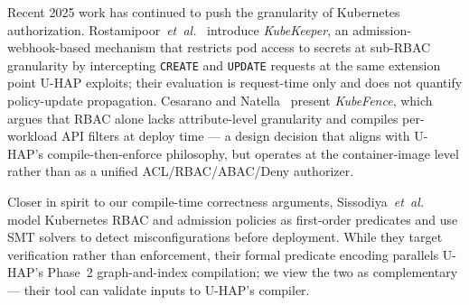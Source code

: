 

Recent 2025 work has continued to push the granularity of Kubernetes
authorization. Rostamipoor~\textit{et~al.}~\cite{rostamipoor2025kubekeeper}
introduce \emph{KubeKeeper}, an admission-webhook-based mechanism that
restricts pod access to secrets at sub-RBAC granularity by intercepting
\texttt{CREATE} and \texttt{UPDATE} requests at the same extension point
U-HAP exploits; their evaluation is request-time only and does not
quantify policy-update propagation. Cesarano and
Natella~\cite{cesarano2025kubefence} present \emph{KubeFence}, which
argues that RBAC alone lacks attribute-level granularity and compiles
per-workload API filters at deploy time --- a design decision that
aligns with U-HAP's compile-then-enforce philosophy, but operates at the
container-image level rather than as a unified ACL/RBAC/ABAC/Deny
authorizer.


Closer in spirit to our compile-time correctness arguments,
Sissodiya~\textit{et~al.}~\cite{sissodiya2025formal} model Kubernetes
RBAC and admission policies as first-order predicates and use SMT
solvers to detect misconfigurations before deployment. While they
target verification rather than enforcement, their formal predicate
encoding parallels U-HAP's Phase~2 graph-and-index compilation; we view
the two as complementary --- their tool can validate inputs to U-HAP's
compiler.
